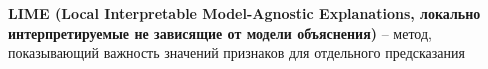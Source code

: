 \textbf{LIME (Local Interpretable Model-Agnostic Explanations, локально интерпретируемые не зависящие от модели объяснения)} -- метод, показывающий важность значений признаков для отдельного предсказания

